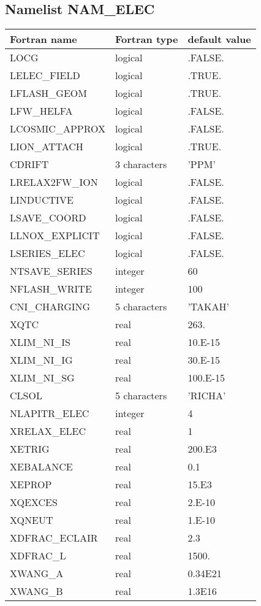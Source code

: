 \subsection{Namelist NAM\_ELEC}
 \begin{longtable} {|p{}|p{}|p{}|}
\hline
Fortran name &  Fortran type & default value \\
\hline 
\endhead
\hline
\endfoot
    LOCG            & logical      & .FALSE. \\
    LELEC\_FIELD    & logical      & .TRUE.  \\
    LFLASH\_GEOM    & logical      & .TRUE.  \\
    LFW\_HELFA      & logical      & .FALSE. \\
    LCOSMIC\_APPROX & logical      & .FALSE. \\
    LION\_ATTACH    & logical      & .TRUE.  \\
    CDRIFT          & 3 characters & 'PPM'   \\
    LRELAX2FW\_ION  & logical      & .FALSE. \\
    LINDUCTIVE      & logical      & .FALSE. \\
    LSAVE\_COORD    & logical      & .FALSE. \\
    LLNOX\_EXPLICIT & logical      & .FALSE. \\
    LSERIES\_ELEC   & logical      & .FALSE. \\
    NTSAVE\_SERIES  & integer      & 60      \\
    NFLASH\_WRITE   & integer      & 100     \\
    CNI\_CHARGING   & 5 characters & 'TAKAH' \\
    XQTC            & real         & 263.    \\
    XLIM\_NI\_IS    & real         & 10.E-15 \\
    XLIM\_NI\_IG    & real         & 30.E-15 \\
    XLIM\_NI\_SG    & real         & 100.E-15\\
    CLSOL           & 5 characters & 'RICHA' \\
    NLAPITR\_ELEC   & integer      & 4       \\
    XRELAX\_ELEC    & real         & 1       \\
    XETRIG          & real         & 200.E3  \\
    XEBALANCE       & real         & 0.1     \\
    XEPROP          & real         & 15.E3   \\
    XQEXCES         & real         & 2.E-10  \\
    XQNEUT          & real         & 1.E-10  \\
    XDFRAC\_ECLAIR  & real         & 2.3     \\
    XDFRAC\_L       & real         & 1500.   \\
    XWANG\_A        & real         & 0.34E21 \\
    XWANG\_B        & real         & 1.3E16  \\
  \end{longtable}


